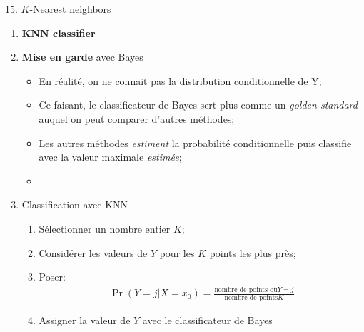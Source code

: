 \documentclass[12pt, titlepage, french]{report}
\begin{document}
\begin{CHPT_SUMM}[label = {PCA-KNN}]{15. $K$-Nearest neighbors}
\begin{enumerate}
\begin{itemize}
		\texttt{[image: src/ISLR-KNN-CLASSIF.png]}	
		\item	Les barrière entre les groupes sont les \textit{Bayes decision boundaries};
		\item[]	Dans le cas de deux classes, il n'en a qu'une seule comme on peut voir;
		\item	On note qu'il y a des mauvaises classifications;
		\item	Puisque le classificateur de Bayes maximise $\Pr(Y = j | X = x_{0})$, le \textit{taux d'erreur de Bayes} est $1 - \underset{j}{\max} \Pr(Y = j | X = x_{0})$;
		\item	En général, le taux d'erreur globale prends la moyenne des probabilités pour toutes les valeurs possible de $X$:
			\begin{align*}
			1 - \text{E}[\underset{j}{\max} \Pr(Y = j | X = x_{0})]
			\end{align*}
		\item	On peut penser au taux d'erreur de Bayes comme l'erreur irréductible en régression;
	\end{itemize}
	\item	\textbf{KNN classifier}
	\item[]	\textbf{Mise en garde} avec Bayes
	\begin{itemize}
		\item	En réalité, on ne connait pas la distribution conditionnelle de Y;
		\item	Ce faisant, le classificateur de Bayes sert plus comme un \textit{golden standard} auquel on peut comparer d'autres méthodes;
		\item	Les autres méthodes \textit{estiment} la probabilité conditionnelle puis classifie avec la valeur maximale \textit{estimée};
		\item	
	\end{itemize}
	\item[]	Classification avec KNN
		\begin{enumerate}
		\item	Sélectionner un nombre entier $K$;
		\item	Considérer les valeurs de $Y$ pour les $K$ points les plus près;
		\item	Poser:
			\begin{align*}
			\Pr(Y = j | X = x_{0})	
			=	\frac{\text{nombre de points où} Y = j }{\text{nombre de points} K}
			\end{align*}
		\item	Assigner la valeur de $Y$ avec le classificateur de Bayes

\end{enumerate}
\end{enumerate}
\end{CHPT_SUMM}
\end{document}
